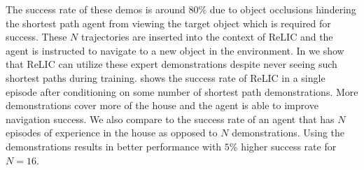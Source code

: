 \documentclass{article}
\newcommand{\method}{ReLIC\xspace}
\begin{document}
The success rate of these demos is around $ 80\%$ due to object occlusions hindering the shortest path agent from viewing the target object which is required for success.
These $ N$ trajectories are inserted into the context of \method and the agent is instructed to navigate to a new object in the environment.
In  we show that \method can utilize these expert demonstrations despite never seeing such shortest paths during training.  shows the success rate of \method in a single episode after conditioning on some number of shortest path demonstrations. More demonstrations cover more of the house and the agent is able to improve navigation success.
We also compare to the success rate of an agent that has $ N$ episodes of experience in the house as opposed to $ N$ demonstrations. Using the demonstrations results in better performance with $ 5\%$ higher success rate for $ N=16$.
\vspace{-5pt}
\end{document}
